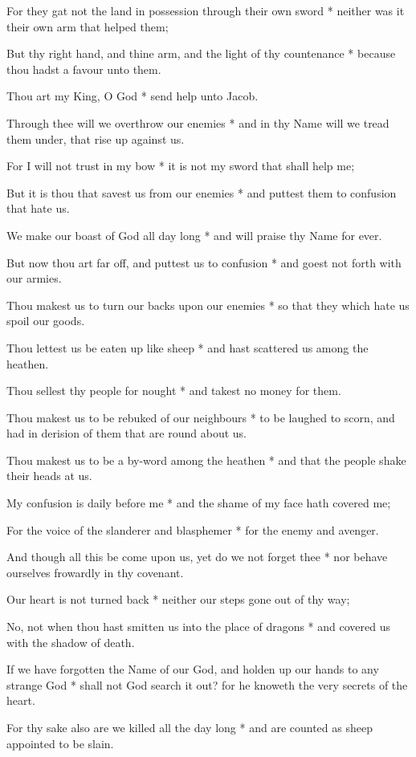 For they gat not the land in possession through their own sword * neither was it their own arm that helped them;

But thy right hand, and thine arm, and the light of thy countenance * because thou hadst a favour unto them.

Thou art my King, O God * send help unto Jacob.

Through thee will we overthrow our enemies * and in thy Name will we tread them under, that rise up against us.

For I will not trust in my bow * it is not my sword that shall help me;

But it is thou that savest us from our enemies * and puttest them to confusion that hate us.

We make our boast of God all day long * and will praise thy Name for ever.

But now thou art far off, and puttest us to confusion * and goest not forth with our armies.

Thou makest us to turn our backs upon our enemies * so that they which hate us spoil our goods.

Thou lettest us be eaten up like sheep * and hast scattered us among the heathen.

Thou sellest thy people for nought * and takest no money for them.

Thou makest us to be rebuked of our neighbours * to be laughed to scorn, and had in derision of them that are round about us.

Thou makest us to be a by-word among the heathen * and that the people shake their heads at us.

My confusion is daily before me * and the shame of my face hath covered me;

For the voice of the slanderer and blasphemer * for the enemy and avenger.

And though all this be come upon us, yet do we not forget thee * nor behave ourselves frowardly in thy covenant.

Our heart is not turned back * neither our steps gone out of thy way;

No, not when thou hast smitten us into the place of dragons * and covered us with the shadow of death.

If we have forgotten the Name of our God, and holden up our hands to any strange God * shall not God search it out? for he knoweth the very secrets of the heart.

For thy sake also are we killed all the day long * and are counted as sheep appointed to be slain.


